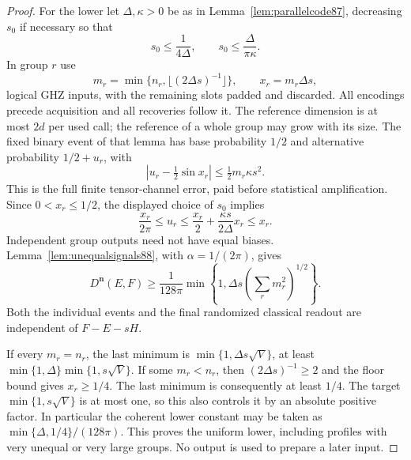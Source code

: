 \begin{proof}
For the lower let $\Delta,\kappa>0$ be as in
Lemma~\ref{lem:parallelcode87}, decreasing $s_0$ if necessary so that
\[
 s_0\le\frac1{4\Delta},\qquad
 s_0\le\frac{\Delta}{\pi\kappa}.
\]
In group $r$ use
\[
 m_r=\min\{n_r,\lfloor(2\Delta s)^{-1}\rfloor\},\qquad
 x_r=m_r\Delta s,
\]
logical GHZ inputs, with the remaining slots padded and discarded.
All encodings precede acquisition and all recoveries follow it.
The reference dimension is at most $2d$ per used call; the reference
of a whole group may grow with its size.
The fixed binary event of that lemma has base probability $1/2$ and
alternative probability $1/2+u_r$, with
\[
 \left|u_r-\tfrac12\sin x_r\right|
       \le\tfrac12m_r\kappa s^2.
\]
This is the full finite tensor-channel error, paid before statistical
amplification.  Since $0<x_r\le1/2$, the displayed choice of $s_0$
implies
\[
 \frac{x_r}{2\pi}\le u_r
 \le\frac{x_r}{2}+\frac{\kappa s}{2\Delta}x_r\le x_r.
\]
Independent group outputs need not have equal biases.
Lemma~\ref{lem:unequalsignals88}, with $\alpha=1/(2\pi)$, gives
\begin{equation}\label{eq:profilelowerfinite88}
 D^{\boldsymbol n}(E,F)\ge
 \frac1{128\pi}\min\left\{1,
                      \Delta s\left(\sum_r m_r^2\right)^{1/2}\right\}.
\end{equation}
Both the individual events and the final randomized classical
readout are independent of $F-E-sH$.

If every $m_r=n_r$, the last minimum is
$\min\{1,\Delta s\sqrt V\}$, at least
$\min\{1,\Delta\}\min\{1,s\sqrt V\}$.
If some $m_r<n_r$, then $(2\Delta s)^{-1}\ge2$ and the floor bound
gives $x_r\ge1/4$.  The last minimum is consequently at least $1/4$.
The target $\min\{1,s\sqrt V\}$ is at most one, so this also controls
it by an absolute positive factor.  In particular the coherent lower
constant may be taken as $\min\{\Delta,1/4\}/(128\pi)$.
This proves the uniform lower, including profiles with very unequal
or very large groups.  No output is used to prepare a later input.
\end{proof}

